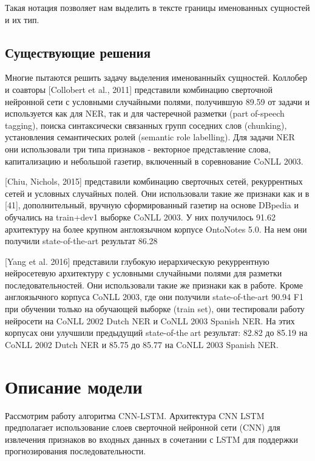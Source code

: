 \documentclass{article}
\begin{document}
Такая нотация позволяет нам выделить в тексте границы именованных сущностей и их тип.

\subsection{Существующие решения}
Многие пытаются решить задачу выделения именованныйх сущностей. 
Коллобер и соавторы [Collobert et al., 2011] представили комбинацию
сверточной нейронной сети с условными случайными полями, получившую
89.59%
от задачи и используется как для NER, так и для частеречной разметки (partof-speech tagging), поиска синтаксически связанных групп соседних слов
(chunking), установления семантических ролей (semantic role labelling). Для
задачи NER они использовали три типа признаков - векторное представление
слова, капитализацию и небольшой газетир, включенный в соревнование
CoNLL 2003. 

[Chiu, Nichols, 2015] представили комбинацию сверточных сетей, 
рекуррентных сетей и условных случайных полей. Они использовали такие
же признаки как и в [41], дополнительный, вручную сформированный
газетир на основе DBpedia и обучались на train+dev1 выборке CoNLL 2003. У
них получилось 91.62%
архитектуру на более крупном англоязычном корпусе OntoNotes 5.0. На нем
они получили state-of-the-art результат 86.28%


[Yang et al. 2016] представили глубокую иерархическую
рекуррентную нейросетевую архитектуру с условными случайными полями
для разметки последовательностей. Они использовали такие же признаки как
в работе. Кроме англоязычного корпуса CoNLL 2003, где они получили
state-of-the-art 90.94 F1 при обучении только на обучающей выборке (train 
set), они тестировали работу нейросети на CoNLL 2002 Dutch NER и CoNLL 
2003 Spanish NER. На этих корпусах они улучшили предыдущий state-of-theart результат: 82.82 до 85.19 на CoNLL 2002 Dutch NER и 85.75 до
85.77 на CoNLL 2003 Spanish NER.


\section{Описание модели}

Рассмотрим работу алгоритма CNN-LSTM. Архитектура CNN LSTM предполагает использование слоев сверточной нейронной сети (CNN) для извлечения признаков во входных данных в сочетании с LSTM для поддержки прогнозирования последовательности.
\end{document}
